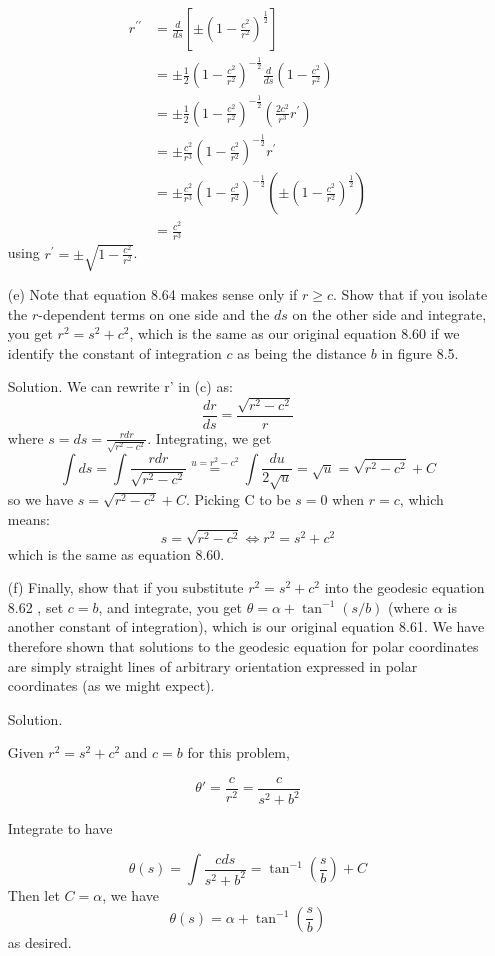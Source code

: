 \documentclass[12pt]{article}
\begin{document}
\begin{enumerate}
  $$
  \begin{aligned}
  r^{\prime \prime} & =\frac{d}{d s}\left[ \pm\left(1-\frac{c^2}{r^2}\right)^{\frac{1}{2}}\right] \\ & = \pm \frac{1}{2}\left(1-\frac{c^2}{r^2}\right)^{-\frac{1}{2}} \frac{d}{d s}\left(1-\frac{c^2}{r^2}\right) \\ & = \pm \frac{1}{2}\left(1-\frac{c^2}{r^2}\right)^{-\frac{1}{2}}\left(\frac{2 c^2}{r^3} r^{\prime}\right) \\ & = \pm \frac{c^2}{r^3}\left(1-\frac{c^2}{r^2}\right)^{-\frac{1}{2}} r^{\prime} \\ & = \pm \frac{c^2}{r^3}\left(1-\frac{c^2}{r^2}\right)^{-\frac{1}{2}}\left( \pm (1-\frac{c^2}{r^2})^{\frac{1}{2}}\right) \\ & =\frac{c^2}{r^3} \end{aligned}
  $$
  using $r^{\prime}= \pm \sqrt{1-\frac{c^2}{r^2}}$.

  \item[(e)] Note that equation 8.64 makes sense only if $r \geq c$. Show that if you isolate the $r$-dependent terms on one side and the $d s$ on the other side and integrate, you get $r^2=s^2+c^2$, which is the same as our original equation 8.60 if we identify the constant of integration $c$ as being the distance $b$ in figure 8.5.
  
  \item[Solution.]
  We can rewrite r' in (c) as:
  $$
  \frac{d r}{d s}=\frac{\sqrt{r^2-c^2}}{r}
  $$
  where $s=d s=\frac{r d r}{\sqrt{r^2-c^2}}$. Integrating, we get
  $$\int d s=\int \frac{r d r}{\sqrt{r^2-c^2}} \stackrel{u=r^2-c^2}{=} \int \frac{d u}{2 \sqrt{u}}=\sqrt{u}=\sqrt{r^2-c^2}+ C$$
  so we have $s=\sqrt{r^2-c^2}+ C$. Picking C to be $s=0$ when $r=c$, which means:
  $$s=\sqrt{r^2-c^2} \Longleftrightarrow r^2=s^2+c^2$$
  which is the same as equation 8.60.


  \item[(f)] Finally, show that if you substitute $r^2=s^2+c^2$ into the geodesic equation 8.62 , set $c=b$, and integrate, you get $\theta=\alpha+\tan ^{-1}(s / b)$ (where $\alpha$ is another constant of integration), which is our original equation 8.61. We have therefore shown that solutions to the geodesic equation for polar coordinates are simply straight lines of arbitrary orientation expressed in polar coordinates (as we might expect).

  \item[Solution.]
  
  Given $r^2=s^2+c^2$ and $c=b$ for this problem,

  $$
  \theta'=\frac{c}{r^2}=\frac{c}{s^2+b^2}
  $$


  Integrate to have

  $$
  \theta(s)=\int \frac{c d s}{s^2+b^2}=\tan ^{-1}\left(\frac{s}{b}\right)+C
  $$
  Then let $C = \alpha$, we have
  $$
  \theta(s)=\alpha+\tan ^{-1}\left(\frac{s}{b}\right)
  $$
  as desired.

\end{enumerate}
\end{document}
